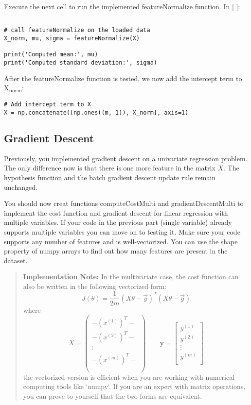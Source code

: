 \documentclass[11pt]{article}
\begin{document}
Execute the next cell to run the implemented featureNormalize function.
In [ ]:
\begin{verbatim}

# call featureNormalize on the loaded data
X_norm, mu, sigma = featureNormalize(X)

print('Computed mean:', mu)
print('Computed standard deviation:', sigma)
\end{verbatim}

After the featureNormalize function is tested, we now add the intercept term to X\textsubscript{norm}:
\begin{verbatim}
# Add intercept term to X
X = np.concatenate([np.ones((m, 1)), X_norm], axis=1)

\end{verbatim}
\subsection{Gradient Descent}
\label{sec:orgcc55811}

Previously, you implemented gradient descent on a univariate regression problem. The only difference now is that there is one more feature in the matrix \(X\). The hypothesis function and the batch gradient descent update rule remain unchanged.

You should now creat functions computeCostMulti and gradientDescentMulti to implement the cost function and gradient descent for linear regression with multiple variables. If your code in the previous part (single variable) already supports multiple variables you can move on to testing it. Make sure your code supports any number of features and is well-vectorized. You can use the shape property of numpy arrays to find out how many features are present in the dataset.
\begin{quote}
\textbf{\textbf{Implementation Note:}} In the multivariate case, the cost function can also be written in the following vectorized form: $$ J(\theta) = \frac{1}{2m}(X\theta - \vec{y})^T(X\theta - \vec{y}) $$ where $$ X = \begin{pmatrix} - (x^{(1)})^T - \\ - (x^{(2)})^T - \\ \vdots \\ - (x^{(m)})^T - \\ \\ \end{pmatrix} \qquad \mathbf{y} = \begin{bmatrix} y^{(1)} \\ y^{(2)} \\ \vdots \\ y^{(m)} \\\end{bmatrix}$$ the vectorized version is efficient when you are working with numerical computing tools like `numpy`. If you are an expert with matrix operations, you can prove to yourself that the two forms are equivalent.
\end{quote}
\end{document}
